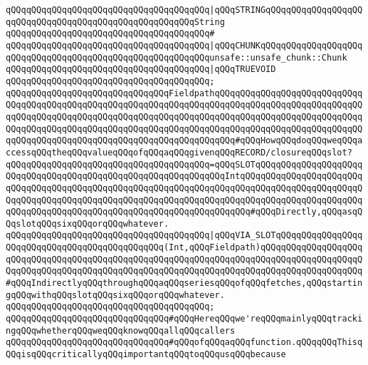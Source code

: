 \verb|qQQqqQQqqQQqqQQqqQQqqQQqqQQqqQQqqQQqqQQq|\verb#|qQQqSTRINGqQQqqQQqqQQqqQQqqQQqqQQqqQQqqQQqqQQqqQQqqQQqqQQqqQQqqQQqString#\newline
\verb|qQQqqQQqqQQqqQQqqQQqqQQqqQQqqQQqqQQqqQQq#|\newline
\verb|qQQqqQQqqQQqqQQqqQQqqQQqqQQqqQQqqQQqqQQq|\verb#|qQQqCHUNKqQQqqQQqqQQqqQQqqQQqqQQqqQQqqQQqqQQqqQQqqQQqqQQqqQQqqQQqqQQqunsafe::unsafe_chunk::Chunk#\newline
\verb|qQQqqQQqqQQqqQQqqQQqqQQqqQQqqQQqqQQqqQQq|\verb#|qQQqTRUEVOID#\newline
\verb|qQQqqQQqqQQqqQQqqQQqqQQqqQQqqQQqqQQqqQQq;|\newline
\newline
\verb|qQQqqQQqqQQqqQQqqQQqqQQqqQQqqQQqFieldpathqQQqqQQqqQQqqQQqqQQqqQQqqQQqqQQqqQQqqQQqqQQqqQQqqQQqqQQqqQQqqQQqqQQqqQQqqQQqqQQqqQQqqQQqqQQqqQQqqQQqqQQqqQQqqQQqqQQqqQQqqQQqqQQqqQQqqQQqqQQqqQQqqQQqqQQqqQQqqQQqqQQqqQQqqQQqqQQqqQQqqQQqqQQqqQQqqQQqqQQqqQQqqQQqqQQqqQQqqQQqqQQqqQQqqQQqqQQqqQQqqQQqqQQqqQQqqQQqqQQqqQQqqQQqqQQqqQQqqQQqqQQq#qQQqHowqQQqdoqQQqweqQQqaccessqQQqtheqQQqvalueqQQqofqQQqaqQQqgivenqQQqRECORD/closureqQQqslot?|\newline
\verb|qQQqqQQqqQQqqQQqqQQqqQQqqQQqqQQqqQQqqQQq=qQQqSLOTqQQqqQQqqQQqqQQqqQQqqQQqqQQqqQQqqQQqqQQqqQQqqQQqqQQqqQQqqQQqqQQqIntqQQqqQQqqQQqqQQqqQQqqQQqqQQqqQQqqQQqqQQqqQQqqQQqqQQqqQQqqQQqqQQqqQQqqQQqqQQqqQQqqQQqqQQqqQQqqQQqqQQqqQQqqQQqqQQqqQQqqQQqqQQqqQQqqQQqqQQqqQQqqQQqqQQqqQQqqQQqqQQqqQQqqQQqqQQqqQQqqQQqqQQqqQQqqQQqqQQqqQQqqQQqqQQqqQQq#qQQqDirectly,qQQqasqQQqslotqQQqsixqQQqorqQQqwhatever.|\newline
\verb|qQQqqQQqqQQqqQQqqQQqqQQqqQQqqQQqqQQqqQQq|\verb#|qQQqVIA_SLOTqQQqqQQqqQQqqQQqqQQqqQQqqQQqqQQqqQQqqQQqqQQqqQQq(Int,qQQqFieldpath)qQQqqQQqqQQqqQQqqQQqqQQqqQQqqQQqqQQqqQQqqQQqqQQqqQQqqQQqqQQqqQQqqQQqqQQqqQQqqQQqqQQqqQQqqQQqqQQqqQQqqQQqqQQqqQQqqQQqqQQqqQQqqQQqqQQqqQQqqQQqqQQqqQQqqQQqqQQqqQQq#\verb|#qQQqIndirectlyqQQqthroughqQQqaqQQqseriesqQQqofqQQqfetches,qQQqstartingqQQqwithqQQqslotqQQqsixqQQqorqQQqwhatever.|\newline
\verb|qQQqqQQqqQQqqQQqqQQqqQQqqQQqqQQqqQQqqQQq;|\newline
\newline
\verb|qQQqqQQqqQQqqQQqqQQqqQQqqQQqqQQq#qQQqHereqQQqwe'reqQQqmainlyqQQqtrackingqQQqwhetherqQQqweqQQqknowqQQqallqQQqcallers|\newline
\verb|qQQqqQQqqQQqqQQqqQQqqQQqqQQqqQQq#qQQqofqQQqaqQQqfunction.qQQqqQQqThisqQQqisqQQqcriticallyqQQqimportantqQQqtoqQQqusqQQqbecause|\newline
